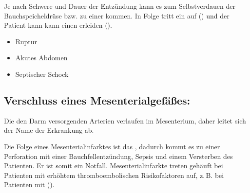 \TextSlide{\TxKomplikationen}
{Je nach Schwere und Dauer der Entzündung kann es zum
Selbstverdauen der Bauchspeicheldrüse bzw. zu einer
 kommen. In Folge tritt ein
 auf
() und der Patient kann
kann einen  erleiden ().

}
{\begin{itemize}
  \item Ruptur
  \item Akutes Abdomen
  \item Septischer Schock
\end{itemize}}
{}
{}
{}




\subsection{Verschluss eines Mesenterialgefäßes: }
\label{topic:mesenterialinfarkt}

\Text
{\TxBeschreibung}
{ Die den
Darm versorgenden Arterien verlaufen im Mesenterium, 
daher leitet sich der Name der Erkrankung ab.


Die Folge eines Mesenterialinfarktes ist das , dadurch kommt es zu
einer Perforation mit einer Bauchfellentzündung, Sepsis und
einem Versterben des Patienten.
Er ist somit ein 
Notfall. 
Mesenterialinfarkte treten gehäuft bei Patienten mit
erhöhtem thromboembolischen Risikofaktoren auf, z.\,B. bei
Patienten mit
().

}
{}
{}
{}
{}


